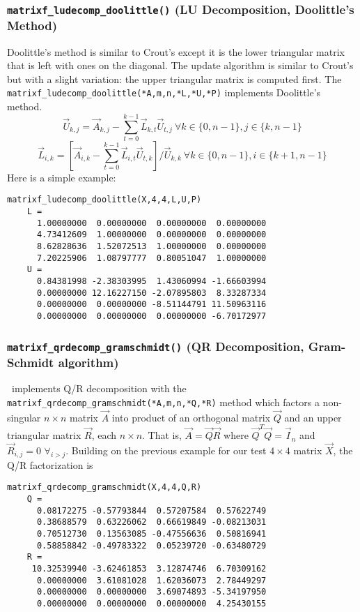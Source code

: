 \subsubsection{{\tt matrixf\_ludecomp\_doolittle()} (LU Decomposition, Doolittle's Method)}
\label{module:matrix:ludecomp_doolittle}
Doolittle's method is similar to Crout's except it is the lower triangular
matrix that is left with ones on the diagonal.
The update algorithm is similar to Crout's but with a slight variation: the
upper triangular matrix is computed first.
The {\tt matrixf\_ludecomp\_doolittle(*A,m,n,*L,*U,*P)} implements
Doolittle's method.
%
\[
    \vec{U}_{k,j} = \vec{A}_{k,j} -
                    \sum_{t=0}^{k-1}{ \vec{L}_{k,t} \vec{U}_{t,j} }
                    \ \forall k \in \{0,n-1\}, j \in \{k,n-1\}
\]
%
\[
    \vec{L}_{i,k} = \left[
                        \vec{A}_{i,k} -
                        \sum_{t=0}^{k-1}{ \vec{L}_{i,t} \vec{U}_{t,k} }
                    \right] / \vec{U}_{k,k}
                    \ \forall k \in \{0,n-1\}, i \in \{k+1,n-1\}
\]
%
Here is a simple example:
\begin{Verbatim}[fontsize=\small]
    matrixf_ludecomp_doolittle(X,4,4,L,U,P)
    L =
      1.00000000  0.00000000  0.00000000  0.00000000
      4.73412609  1.00000000  0.00000000  0.00000000
      8.62828636  1.52072513  1.00000000  0.00000000
      7.20225906  1.08797777  0.80051047  1.00000000
    U =
      0.84381998 -2.38303995  1.43060994 -1.66603994
      0.00000000 12.16227150 -2.07895803  8.33287334
      0.00000000  0.00000000 -8.51144791 11.50963116
      0.00000000  0.00000000  0.00000000 -6.70172977
\end{Verbatim}

\subsubsection{{\tt matrixf\_qrdecomp\_gramschmidt()}
               (QR Decomposition, Gram-Schmidt algorithm)}
\label{module:matrix:qrdecomp_gramschmidt}
\liquid\ implements Q/R decomposition with the
{\tt matrixf\_qrdecomp\_gramschmidt(*A,m,n,*Q,*R)} method which factors
a non-singular $n \times n$ matrix $\vec{A}$ into
product of an orthogonal matrix $\vec{Q}$ and an upper triangular matrix
$\vec{R}$, each $n \times n$.
That is, $\vec{A} = \vec{Q}\vec{R}$ where
$\vec{Q}^T\vec{Q} = \vec{I}_n$ and
$\vec{R}_{i,j} = 0\,\, \forall_{i > j}$.
%
Building on the previous example for our test $4 \times 4$ matrix
$\vec{X}$, the Q/R factorization is
%
\begin{Verbatim}[fontsize=\small]
    matrixf_qrdecomp_gramschmidt(X,4,4,Q,R)
    Q =
      0.08172275 -0.57793844  0.57207584  0.57622749
      0.38688579  0.63226062  0.66619849 -0.08213031
      0.70512730  0.13563085 -0.47556636  0.50816941
      0.58858842 -0.49783322  0.05239720 -0.63480729
    R =
     10.32539940 -3.62461853  3.12874746  6.70309162
      0.00000000  3.61081028  1.62036073  2.78449297
      0.00000000  0.00000000  3.69074893 -5.34197950
      0.00000000  0.00000000  0.00000000  4.25430155
\end{Verbatim}

